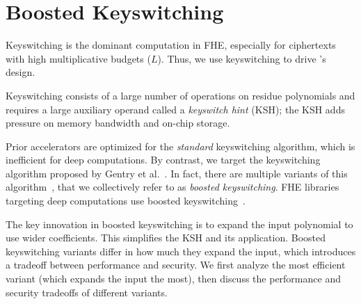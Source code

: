 \section{Boosted Keyswitching}\label{sec:keyswitching}

Keyswitching is the dominant computation in FHE, especially for ciphertexts 
with high multiplicative budgets ($L$).
Thus, we use keyswitching to drive \name's design.



Keyswitching consists of a large number of operations on residue polynomials and 
requires a large auxiliary operand called a  \emph{keyswitch hint} (KSH);
the KSH adds pressure on memory bandwidth and on-chip storage.

\figKScompare

Prior accelerators are optimized for the \emph{standard} keyswitching algorithm,
which is inefficient for deep computations.
By contrast, we target the keyswitching algorithm
proposed by Gentry et al.~\cite[Section 3.1]{gentry:crypto2012:homomorphic}.
In fact, there are multiple variants of this algorithm~\cite[Section 5.3.4]{halevi2020helib},
that we collectively refer to as \emph{boosted keyswitching}.
FHE libraries targeting deep computations
use boosted keyswitching~\cite{gentry:crypto2012:homomorphic,halevi2020helib,heaan,mouchet2020lattigo}.

The key innovation in boosted keyswitching is to expand the input polynomial to use wider coefficients.
This simplifies the KSH and its application.
Boosted keyswitching variants differ in how much they expand the input,
which introduces a tradeoff between performance and security.
We first analyze the most efficient variant (which expands the input the most),
then discuss the performance and security tradeoffs of different variants.



